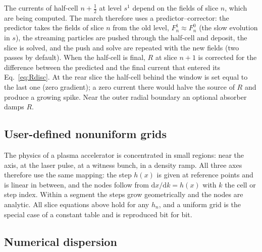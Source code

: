 \documentclass[preprint,12pt]{elsarticle}
\newcommand{\dd}{\mathrm{d}}
\begin{document}
The currents of half-cell $n+\frac12$ at level $s^1$ depend on the fields of slice $n$, which are being computed. The march therefore uses a predictor--corrector: the predictor takes the fields of slice $n$ from the old level, $F^1_n \approx F^0_n$ (the slow evolution in $s$), the streaming particles are pushed through the half-cell and deposit, the slice is solved, and the push and solve are repeated with the new fields (two passes by default). When the half-cell is final, $R$ at slice $n+1$ is corrected for the difference between the predicted and the final current that entered its Eq.~\eqref{eq:Rdisc}. At the rear slice the half-cell behind the window is set equal to the last one (zero gradient); a zero current there would halve the source of $R$ and produce a growing spike. Near the outer radial boundary an optional absorber damps $R$.

\subsection{User-defined nonuniform grids}\label{sec:grids}

The physics of a plasma accelerator is concentrated in small regions: near the axis, at the laser pulse, at a witness bunch, in a density ramp. All three axes therefore use the same mapping: the step $h(x)$ is given at reference points and is linear in between, and the nodes follow from $\dd x/\dd k = h(x)$ with $k$ the cell or step index. Within a segment the steps grow geometrically and the nodes are analytic. All slice equations above hold for any $h_n$, and a uniform grid is the special case of a constant table and is reproduced bit for bit.

\subsection{Numerical dispersion}\label{sec:dispersion}
\end{document}
